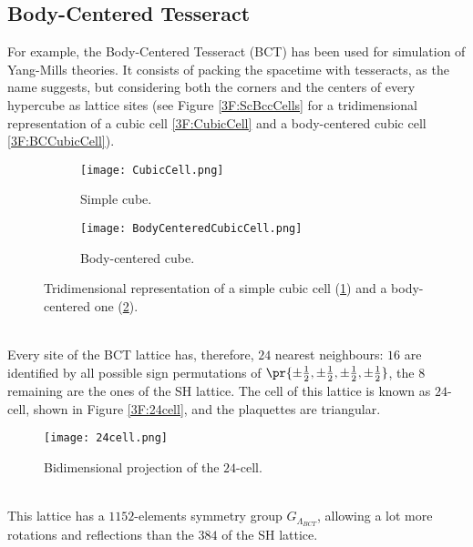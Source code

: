 \subsection{Body-Centered Tesseract\label{Sec3:BCT}}
For example, the Body-Centered Tesseract (BCT) has been used for simulation of Yang-Mills theories.
It consists of packing the spacetime with tesseracts, as the name suggests, but considering both the corners and the centers of every hypercube as lattice sites (see Figure \eqref{3F:ScBccCells} for a tridimensional representation of a cubic cell \eqref{3F:CubicCell} and a body-centered cubic cell \eqref{3F:BCCubicCell}).\\
\begin{figure}[!htbp]
    \centering
    \hspace{0.1\textwidth}
    \begin{subfigure}[b]{0.25\textwidth}
        \texttt{[image: CubicCell.png]}
        \caption{Simple cube.}
        \label{3F:CubicCell}
    \end{subfigure}
    \hspace{0.2\textwidth}
    \begin{subfigure}[b]{0.25\textwidth}
        \texttt{[image: BodyCenteredCubicCell.png]}
        \caption{Body-centered cube.}
        \label{3F:BCCubicCell}
    \end{subfigure}
    \hspace{0.2\textwidth}
    \caption{Tridimensional representation of a simple cubic cell (\ref{3F:CubicCell}) and a body-centered one (\ref{3F:BCCubicCell}).}
    \label{3F:ScBccCells}
\end{figure}\\
Every site of the BCT lattice has, therefore, $24$ nearest neighbours: $16$ are identified by all possible sign permutations of $\pr{\pm\frac12,\pm\frac12,\pm\frac12,\pm\frac12}$, the $8$ remaining are the ones of the SH lattice.
The cell of this lattice is known as $24$-cell, shown in Figure \eqref{3F:24cell}, and the plaquettes are triangular.
\begin{figure}[!htbp]
    \centering
    \texttt{[image: 24cell.png]}
    \caption{Bidimensional projection of the $24$-cell.}
    \label{3F:24cell}
\end{figure}\\
This lattice has a $1152$-elements symmetry group $G_{\Lambda_{BCT}}$, allowing a lot more rotations and reflections than the $384$ of the SH lattice.

